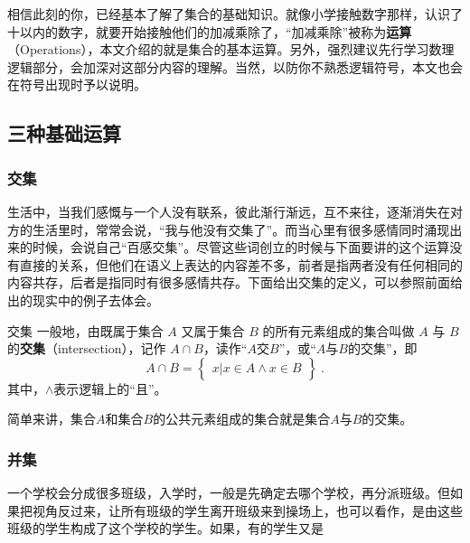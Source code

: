 
\begin{issues}
\issueDraft
\end{issues}
相信此刻的你，已经基本了解了集合的基础知识。就像小学接触数字那样，认识了十以内的数字，就要开始接触他们的加减乘除了，“加减乘除”被称为\textbf{运算}（Operations），本文介绍的就是集合的基本运算。另外，强烈建议先行学习数理逻辑部分，会加深对这部分内容的理解。当然，以防你不熟悉逻辑符号，本文也会在符号出现时予以说明。

\subsection{三种基础运算}

\subsubsection{交集}

生活中，当我们感慨与一个人没有联系，彼此渐行渐远，互不来往，逐渐消失在对方的生活里时，常常会说，“我与他没有交集了”。而当心里有很多感情同时涌现出来的时候，会说自己“百感交集”。尽管这些词创立的时候与下面要讲的这个运算没有直接的关系，但他们在语义上表达的内容差不多，前者是指两者没有任何相同的内容共存，后者是指同时有很多感情共存。下面给出交集的定义，可以参照前面给出的现实中的例子去体会。

\begin{definition}{交集}
一般地，由既属于集合 $A$ 又属于集合 $B$ 的所有元素组成的集合叫做 $A$ 与 $B$ 的\textbf{交集}（intersection），记作 $A \cap B$，读作“$A$交$B$”，或“$A$与$B$的交集”，即
\begin{equation}
A\cap B = \begin{Bmatrix} x|x\in A\land x\in B \end{Bmatrix}~.
\end{equation}
其中，$\land$表示逻辑上的“且”。
\end{definition}

简单来讲，集合$A$和集合$B$的公共元素组成的集合就是集合$A$与$B$的交集。

\subsubsection{并集}

一个学校会分成很多班级，入学时，一般是先确定去哪个学校，再分派班级。但如果把视角反过来，让所有班级的学生离开班级来到操场上，也可以看作，是由这些班级的学生构成了这个学校的学生。如果，有的学生又是

